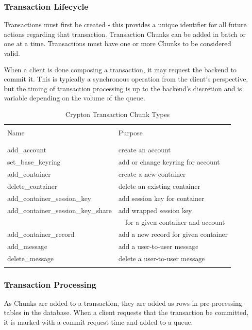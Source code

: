 \documentclass[conference]{IEEEtran}
\begin{document}
\subsubsection{Transaction Lifecycle}
Transactions must first be created - this provides a unique identifier for
all future actions regarding that transaction. Transaction Chunks can be added
in batch or one at a time. Transactions must have one or more Chunks to be
considered valid.

When a client is done composing a transaction, it may request the backend
to commit it. This is typically a synchronous operation from the client's
perspective, but the timing of transaction processing is up to the backend's
discretion and is variable depending on the volume of the queue.

\begin{table}[ht]
\caption{Crypton Transaction Chunk Types}
\centering
\begin{tabular}{l l}
\hline\hline
\\ [0.1ex]
Name & Purpose \\
\\ [0.1ex]
\hline
\\ [0.3ex]
add\_account & create an account \\
set\_base\_keyring & add or change keyring for account \\
add\_container & create a new container \\
delete\_container & delete an existing container \\
add\_container\_session\_key & add session key for container \\
add\_container\_session\_key\_share & add wrapped session key \\ & \ \ for a
given container and account \\
add\_container\_record & add a new record for given container \\
add\_message & add a user-to-user message \\
delete\_message & delete a user-to-user message \\
\\ [0.3ex]
\hline
\end{tabular}
\label{table:nonlin}
\end{table}

\subsubsection{Transaction Processing}
As Chunks are added to a transaction, they are added as rows in
pre-processing tables in the database. When a client requests that the
transaction be committed, it is marked with a commit request time and added
to a queue.
\end{document}
